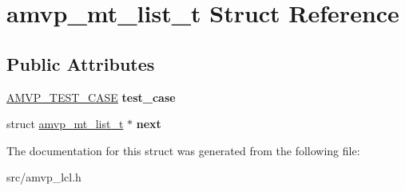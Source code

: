 \hypertarget{structamvp__mt__list__t}{\section{amvp\-\_\-mt\-\_\-list\-\_\-t Struct Reference}
\label{structamvp__mt__list__t}
}
\subsection*{Public Attributes}
\begin{DoxyCompactItemize}
\item 
\hypertarget{structamvp__mt__list__t_a4af749ebc2c307804f234dfa5623b62d}{\hyperlink{structamvp__tc__t}{A\-M\-V\-P\-\_\-\-T\-E\-S\-T\-\_\-\-C\-A\-S\-E} {\bfseries test\-\_\-case}}\label{structamvp__mt__list__t_a4af749ebc2c307804f234dfa5623b62d}

\item 
\hypertarget{structamvp__mt__list__t_a5c61ac49332db174da1798e6c2977fb5}{struct \hyperlink{structamvp__mt__list__t}{amvp\-\_\-mt\-\_\-list\-\_\-t} $\ast$ {\bfseries next}}\label{structamvp__mt__list__t_a5c61ac49332db174da1798e6c2977fb5}

\end{DoxyCompactItemize}


The documentation for this struct was generated from the following file\-:\begin{DoxyCompactItemize}
\item 
src/amvp\-\_\-lcl.\-h\end{DoxyCompactItemize}
